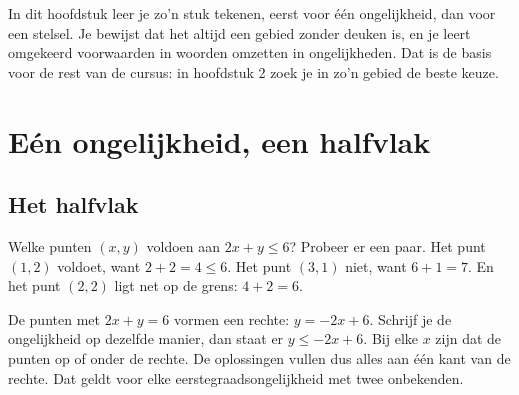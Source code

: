 In dit hoofdstuk leer je zo'n stuk tekenen, eerst voor één ongelijkheid, dan voor een stelsel. Je bewijst dat het altijd een gebied zonder deuken is, en je leert omgekeerd voorwaarden in woorden omzetten in ongelijkheden. Dat is de basis voor de rest van de cursus: in hoofdstuk 2 zoek je in zo'n gebied de beste keuze.

\begin{oefeningen}[Start]

\end{oefeningen}


\section{Eén ongelijkheid, een halfvlak}

\subsection{Het halfvlak}

Welke punten $(x, y)$ voldoen aan $2x + y \leqslant 6$? Probeer er een paar. Het punt $(1, 2)$ voldoet, want $2 + 2 = 4 \leqslant 6$. Het punt $(3, 1)$ niet, want $6 + 1 = 7$. En het punt $(2, 2)$ ligt net op de grens: $4 + 2 = 6$.

De punten met $2x + y = 6$ vormen een rechte: $y = -2x + 6$. Schrijf je de ongelijkheid op dezelfde manier, dan staat er $y \leqslant -2x + 6$. Bij elke $x$ zijn dat de punten op of onder de rechte. De oplossingen vullen dus alles aan één kant van de rechte. Dat geldt voor elke eerstegraadsongelijkheid met twee onbekenden.

